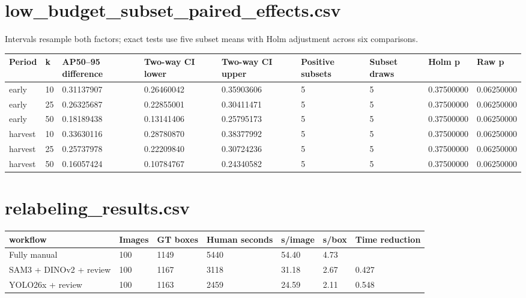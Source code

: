 \documentclass{article}
\begin{document}
\section*{low\_budget\_subset\_paired\_effects.csv}
Intervals resample both factors; exact tests use five subset means with Holm adjustment across six comparisons.\par\medskip
\begin{lrbox}{\resulttable}\begin{tabular}{lllllllll}
\toprule
Period & k & AP50--95 difference & Two-way CI lower & Two-way CI upper & Positive subsets & Subset draws & Holm p & Raw p \\
\midrule
early & 10 & 0.31137907 & 0.26460042 & 0.35903606 & 5 & 5 & 0.37500000 & 0.06250000 \\
early & 25 & 0.26325687 & 0.22855001 & 0.30411471 & 5 & 5 & 0.37500000 & 0.06250000 \\
early & 50 & 0.18189438 & 0.13141406 & 0.25795173 & 5 & 5 & 0.37500000 & 0.06250000 \\
harvest & 10 & 0.33630116 & 0.28780870 & 0.38377992 & 5 & 5 & 0.37500000 & 0.06250000 \\
harvest & 25 & 0.25737978 & 0.22209840 & 0.30724236 & 5 & 5 & 0.37500000 & 0.06250000 \\
harvest & 50 & 0.16057424 & 0.10784767 & 0.24340582 & 5 & 5 & 0.37500000 & 0.06250000 \\
\bottomrule
\end{tabular}\end{lrbox}
\noindent\ifdim\wd\resulttable>\linewidth\resizebox{.99\linewidth}{!}{\usebox{\resulttable}}\else\usebox{\resulttable}\fi
\clearpage
\section*{relabeling\_results.csv}
\begin{lrbox}{\resulttable}\begin{tabular}{lllllll}
\toprule
workflow & Images & GT boxes & Human seconds & s/image & s/box & Time reduction \\
\midrule
Fully manual & 100 & 1149 & 5440 & 54.40 & 4.73 &  \\
SAM3 + DINOv2 + review & 100 & 1167 & 3118 & 31.18 & 2.67 & 0.427 \\
YOLO26x + review & 100 & 1163 & 2459 & 24.59 & 2.11 & 0.548 \\
\bottomrule
\end{tabular}\end{lrbox}
\noindent\ifdim\wd\resulttable>\linewidth\resizebox{.99\linewidth}{!}{\usebox{\resulttable}}\else\usebox{\resulttable}\fi
\clearpage
\end{document}
